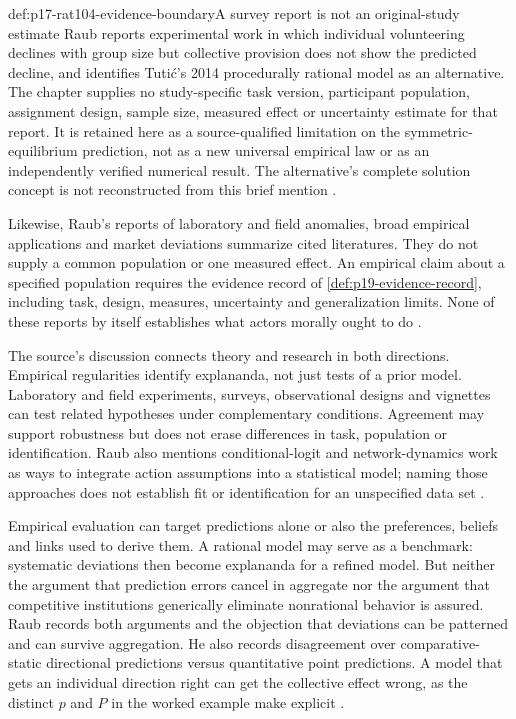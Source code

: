 \begin{proofboundary}{def:p17-rat104-evidence-boundary}{A survey report is not an original-study estimate}
Raub reports experimental work in which individual volunteering declines
with group size but collective provision does not show the predicted decline,
and identifies Tuti\'c's 2014 procedurally rational model as an alternative.
The chapter supplies no study-specific task version, participant population,
assignment design, sample size, measured effect or uncertainty estimate for
that report. It is retained here as a source-qualified limitation on the
symmetric-equilibrium prediction, not as a new universal empirical law or
as an independently verified numerical result. The alternative's complete
solution concept is not reconstructed from this brief mention
\parencite[p.~615]{Raub2021RationalChoiceSocialSciences}.

Likewise, Raub's reports of laboratory and field anomalies, broad empirical
applications and market deviations summarize cited literatures. They do
not supply a common population or one measured effect. An empirical claim
about a specified population requires the evidence record of
\cref{def:p19-evidence-record}, including task, design, measures,
uncertainty and generalization limits. None of these reports by itself
establishes what actors morally ought to do
\parencite[pp.~616, 619--620]{Raub2021RationalChoiceSocialSciences}.
\end{proofboundary}

The source's discussion connects theory and research in both directions.
Empirical regularities identify explananda, not just tests of a prior model.
Laboratory and field experiments, surveys, observational designs and
vignettes can test related hypotheses under complementary conditions.
Agreement may support robustness but does not erase differences in task,
population or identification. Raub also mentions conditional-logit and
network-dynamics work as ways to integrate action assumptions into a
statistical model; naming those approaches does not establish fit or
identification for an unspecified data set
\parencite[pp.~619--620]{Raub2021RationalChoiceSocialSciences}.

Empirical evaluation can target predictions alone or also the preferences,
beliefs and links used to derive them. A rational model may serve as a
benchmark: systematic deviations then become explananda for a refined
model. But neither the argument that prediction errors cancel in aggregate
nor the argument that competitive institutions generically eliminate
nonrational behavior is assured. Raub records both arguments and the
objection that deviations can be patterned and can survive aggregation.
He also records disagreement over comparative-static directional predictions
versus quantitative point predictions. A model that gets an individual
direction right can get the collective effect wrong, as the distinct
\(p\) and \(P\) in the worked example make explicit
\parencite[pp.~615, 619--620]{Raub2021RationalChoiceSocialSciences}.


